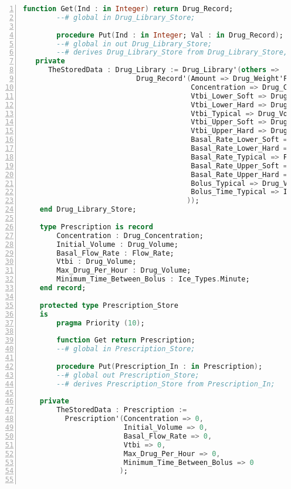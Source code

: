 \begin{lstlisting}[language=ada, gobble=0, numbers=left, caption={\lstinline{Pca_Types} package}, label={listing:pca_generated:pca_types}]
        function Get(Ind : in Integer) return Drug_Record;
        --# global in Drug_Library_Store;

        procedure Put(Ind : in Integer; Val : in Drug_Record);
        --# global in out Drug_Library_Store;
        --# derives Drug_Library_Store from Drug_Library_Store, Ind, Val;
   private
      TheStoredData : Drug_Library := Drug_Library'(others =>        
                           Drug_Record'(Amount => Drug_Weight'First,
                                        Concentration => Drug_Concentration'First,
                                        Vtbi_Lower_Soft => Drug_Volume'First,
                                        Vtbi_Lower_Hard => Drug_Volume'First,
                                        Vtbi_Typical => Drug_Volume'First,
                                        Vtbi_Upper_Soft => Drug_Volume'First,
                                        Vtbi_Upper_Hard => Drug_Volume'First,
                                        Basal_Rate_Lower_Soft => Flow_Rate'First,
                                        Basal_Rate_Lower_Hard => Flow_Rate'First,
                                        Basal_Rate_Typical => Flow_Rate'First,
                                        Basal_Rate_Upper_Soft => Flow_Rate'First,
                                        Basal_Rate_Upper_Hard => Flow_Rate'First,
                                        Bolus_Typical => Drug_Volume'First,
                                        Bolus_Time_Typical => Ice_Types.Minute'First
                                       ));
    end Drug_Library_Store;

    type Prescription is record
        Concentration : Drug_Concentration;
        Initial_Volume : Drug_Volume;
        Basal_Flow_Rate : Flow_Rate;
        Vtbi : Drug_Volume;
        Max_Drug_Per_Hour : Drug_Volume;
        Minimum_Time_Between_Bolus : Ice_Types.Minute;
    end record;

    protected type Prescription_Store
    is
        pragma Priority (10);

        function Get return Prescription;
        --# global in Prescription_Store;

        procedure Put(Prescription_In : in Prescription);
        --# global out Prescription_Store;
        --# derives Prescription_Store from Prescription_In;

    private
        TheStoredData : Prescription :=
          Prescription'(Concentration => 0,
                        Initial_Volume => 0,
                        Basal_Flow_Rate => 0,
                        Vtbi => 0,
                        Max_Drug_Per_Hour => 0,
                        Minimum_Time_Between_Bolus => 0
                       );


\end{lstlisting}
